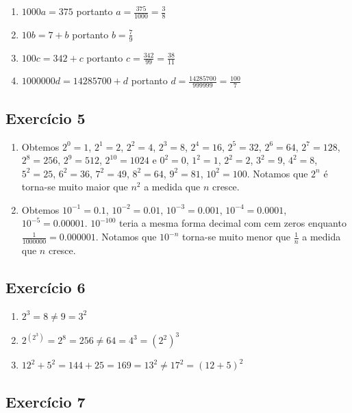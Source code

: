 \begin{enumerate}
\item $1000 a = 375$ portanto $a = \frac{375}{1000} = \frac{3}{8}$
\item $10b = 7+b$ portanto $b = \frac{7}{9}$
\item $100c = 342 + c$ portanto $c = \frac{342}{99} = \frac{38}{11}$
\item $1000000 d = 14285700 + d$ portanto $d = \frac{14285700}{999999} =
  \frac{100}{7}$
\end{enumerate}

\subsection*{Exercício 5}

\begin{enumerate}
\item Obtemos
  $2^0 = 1$,
  $2^1 = 2$,
  $2^2 = 4$,
  $2^3 = 8$,
  $2^4 = 16$,
  $2^5 = 32$,
  $2^6 = 64$,
  $2^7 = 128$,
  $2^8 = 256$,
  $2^9 = 512$,
  $2^{10} = 1024$ e
  $0^2 = 0$,
  $1^2 = 1$,
  $2^2 = 2$,
  $3^2 = 9$,
  $4^2 = 8$,
  $5^2 = 25$,
  $6^2 = 36$,
  $7^2 = 49$,
  $8^2 = 64$,
  $9^2 = 81$,
  $10^2 = 100$.
  Notamos que $2^n$ é torna-se muito maior que $n^2$ a medida que $n$ cresce.
\item Obtemos
  $10^{-1} = 0.1$,
  $10^{-2} = 0.01$,
  $10^{-3} = 0.001$,
  $10^{-4} = 0.0001$,
  $10^{-5} = 0.00001$.
  $10^{-100}$ teria a mesma forma decimal com cem zeros enquanto 
  $\frac{1}{1000000} = 0.000001$. Notamos que $10^{-n}$ torna-se muito menor que
  $\frac{1}{n}$ a medida que $n$ cresce.
\end{enumerate}

\subsection*{Exercício 6}

\begin{enumerate}
\item $2^3 = 8 \neq 9 = 3^2$
\item $2^{\left(2^3\right)} = 2^8 = 256 \neq 64 = 4^3 = {\left(2^2\right)}^3$
\item $12^2 + 5^2 = 144 + 25 = 169 = 13^2 \neq 17^2 = \left(12+5\right)^2$
\end{enumerate}

\subsection*{Exercício 7}

